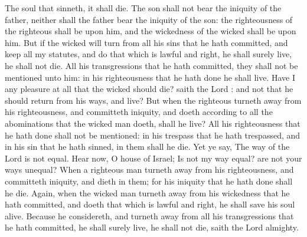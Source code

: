  The soul that sinneth, it shall die. The son shall not bear the iniquity of the father, neither shall the father bear the iniquity of the son: the righteousness of the righteous shall be upon him, and the wickedness of the wicked shall be upon him. But if the wicked will turn from all his sins that he hath committed, and keep all my statutes, and do that which is lawful and right, he shall surely live, he shall not die. All his transgressions that he hath committed, they shall not be mentioned unto him: in his righteousness that he hath done he shall live. Have I any pleasure at all that the wicked should die? saith the Lord : and not that he should return from his ways, and live? But when the righteous turneth away from his righteousness, and committeth iniquity, and doeth according to all the abominations that the wicked man doeth, shall he live? All his righteousness that he hath done shall not be mentioned: in his trespass that he hath trespassed, and in his sin that he hath sinned, in them shall he die. Yet ye say, The way of the Lord is not equal. Hear now, O house of Israel; Is not my way equal? are not your ways unequal? When a righteous man turneth away from his righteousness, and committeth iniquity, and dieth in them; for his iniquity that he hath done shall he die. Again, when the wicked man turneth away from his wickedness that he hath committed, and doeth that which is lawful and right, he shall save his soul alive. Because he considereth, and turneth away from all his transgressions that he hath committed, he shall surely live, he shall not die, saith the Lord almighty.


